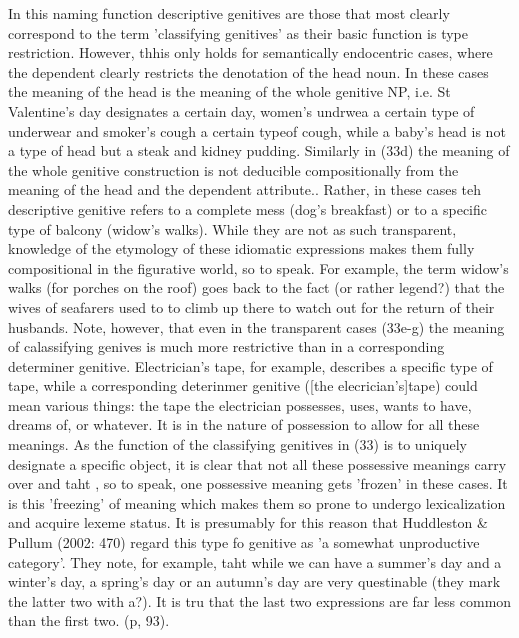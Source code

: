 \documentclass[11pt,a4paper]{article}
\begin{document}
	
	In this naming function descriptive genitives are those that most clearly correspond to the term 'classifying genitives' as their basic
	function is type restriction. However, thhis only holds for semantically endocentric cases, where the dependent 
	clearly restricts the denotation of the head noun. In these cases the meaning of the head is the meaning of the 
	whole genitive NP, i.e. St Valentine's day designates a certain day, women's undrwea a certain type of underwear
	and smoker's cough a certain typeof cough, while a baby's head is not a type of head but a steak and kidney pudding.
	Similarly in (33d) the meaning of the whole genitive construction is not deducible compositionally from the meaning of the 
	head and the dependent attribute.. Rather, in these cases teh descriptive genitive refers to a complete mess (dog's breakfast) or to a specific type of balcony 
	(widow's walks). While they are not as such transparent, knowledge of the etymology of these idiomatic expressions makes them fully
	compositional in the figurative world, so to speak. For example, the term widow's walks (for porches on the roof)
	goes back to the fact (or rather legend?) that the wives of seafarers used to to climb up there to watch out for the 
	return of their husbands. Note, however, that even in the transparent cases (33e-g) the meaning of calassifying genives
	is much more restrictive than in a corresponding determiner genitive. Electrician's tape, for example, describes a specific
	type of tape, while a corresponding deterinmer genitive ([the elecrician's]tape) could mean various things: the 
	tape the electrician possesses, uses, wants to have, dreams of, or whatever. It is in the nature of possession to allow
	for all these meanings. As the function of the classifying genitives in (33) is to uniquely designate a specific object, it is 
	clear that not all these possessive  meanings carry over and taht , so to speak, one possessive meaning gets 'frozen' in these cases. 
	It is this 'freezing' of meaning which makes them so prone to undergo lexicalization and acquire lexeme  status. It is 
	presumably for this reason that Huddleston \& Pullum (2002: 470) regard this type fo genitive as 
	'a somewhat unproductive category'. They note, for example, taht while we can have a summer's day and a winter's day,
	a spring's day or an autumn's day are very questinable (they mark the latter two with a?). It is tru that the last two expressions are far less common than
	the first two. (p, 93). 
	
\end{document}

